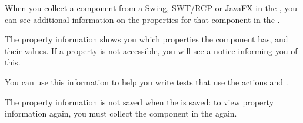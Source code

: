 
When you collect a component from a Swing, SWT/RCP or JavaFX \gdaut{} in the \gdomm{} , you can see additional information on the properties for that component in the \gdpropview{}. 

The property information shows you which properties the component has, and their values. If a property is not accessible, you will see a notice informing you of this. 

You can use this information to help you write tests that use the actions  and . 

The property information is not saved when the \gdomeditor{} is saved: to view property information again, you must collect the component in the \gdomm{} again. 

